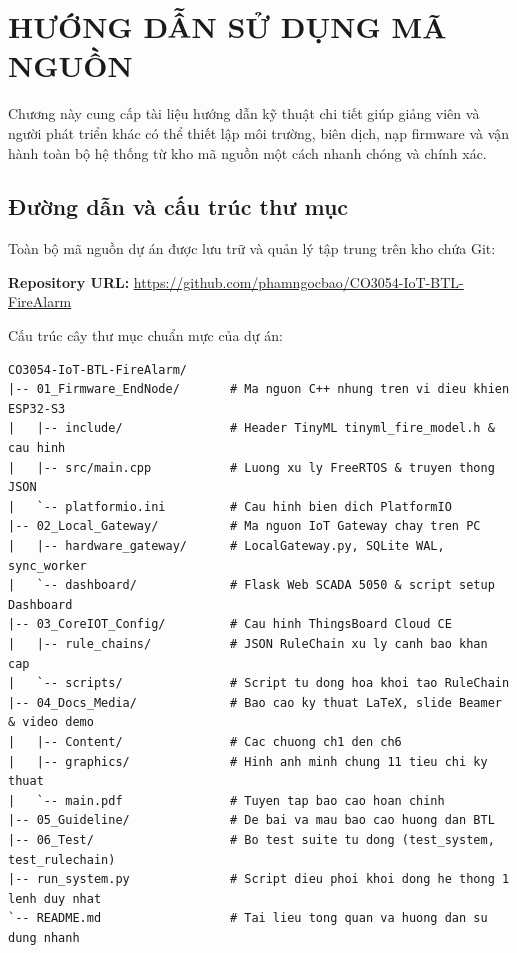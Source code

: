 \section{HƯỚNG DẪN SỬ DỤNG MÃ NGUỒN}

Chương này cung cấp tài liệu hướng dẫn kỹ thuật chi tiết giúp giảng viên và người phát triển khác có thể thiết lập môi trường, biên dịch, nạp firmware và vận hành toàn bộ hệ thống từ kho mã nguồn một cách nhanh chóng và chính xác.

\subsection{Đường dẫn và cấu trúc thư mục}
Toàn bộ mã nguồn dự án được lưu trữ và quản lý tập trung trên kho chứa Git:
\begin{center}
\textbf{Repository URL:} \url{https://github.com/phamngocbao/CO3054-IoT-BTL-FireAlarm}
\end{center}

Cấu trúc cây thư mục chuẩn mực của dự án:
\begin{lstlisting}[style=mystyle]
CO3054-IoT-BTL-FireAlarm/
|-- 01_Firmware_EndNode/       # Ma nguon C++ nhung tren vi dieu khien ESP32-S3
|   |-- include/               # Header TinyML tinyml_fire_model.h & cau hinh
|   |-- src/main.cpp           # Luong xu ly FreeRTOS & truyen thong JSON
|   `-- platformio.ini         # Cau hinh bien dich PlatformIO
|-- 02_Local_Gateway/          # Ma nguon IoT Gateway chay tren PC
|   |-- hardware_gateway/      # LocalGateway.py, SQLite WAL, sync_worker
|   `-- dashboard/             # Flask Web SCADA 5050 & script setup Dashboard
|-- 03_CoreIOT_Config/         # Cau hinh ThingsBoard Cloud CE
|   |-- rule_chains/           # JSON RuleChain xu ly canh bao khan cap
|   `-- scripts/               # Script tu dong hoa khoi tao RuleChain
|-- 04_Docs_Media/             # Bao cao ky thuat LaTeX, slide Beamer & video demo
|   |-- Content/               # Cac chuong ch1 den ch6
|   |-- graphics/              # Hinh anh minh chung 11 tieu chi ky thuat
|   `-- main.pdf               # Tuyen tap bao cao hoan chinh
|-- 05_Guideline/              # De bai va mau bao cao huong dan BTL
|-- 06_Test/                   # Bo test suite tu dong (test_system, test_rulechain)
|-- run_system.py              # Script dieu phoi khoi dong he thong 1 lenh duy nhat
`-- README.md                  # Tai lieu tong quan va huong dan su dung nhanh
\end{lstlisting}


